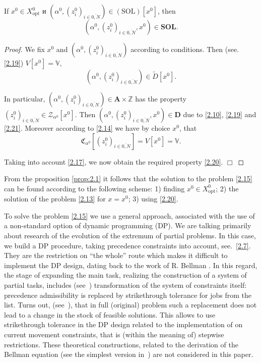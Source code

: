 \documentclass[10pt]{article}
\begin{document}
\begin{proposition}
\label{prop:2.1}
If
$x^0 \in X^0_{\mathrm{opt}}$ и $(\alpha^0,(z_i^0)_{i \in \overline{0,N}}) \in (\mathrm{SOL})[x^0]$,
then
\begin{equation}\label{2.20}
  (\alpha^0,(z_i^0)_{i \in \overline{0,N}},x^0) \in \mathbf{SOL}.
\end{equation}
\end{proposition}

\begin{proof}

We fix
$x^0$
and
$(\alpha^0,(z_i^0)_{i \in \overline{0,N}})$
according to conditions.
Then
(see. \eqref{2.19})
$V[x^0] = \mathbb{V},$
\begin{equation}\label{2.21}
 (\alpha^0,(z_i^0)_{i \in \overline{0,N}}) \in \tilde{D}[x^0].
\end{equation}

In particular,
$(\alpha^0,(z_i^0)_{i \in \overline{0,N}}) \in \mathbf{A} \times \mathbb{Z}$
has the property
$(z_i^0)_{i \in \overline{0,N}} \in \mathcal{Z}_{\alpha^0}[x^0]$.
Then
$(\alpha^0,(z_i^0)_{i \in \overline{0,N}},x^0) \in \mathbf{D}$
due to
\eqref{2.10}, \eqref{2.19} and \eqref{2.21}.
Moreover according to
\eqref{2.14}
we have by choice
$x^0$,
that
$$
  \mathfrak{C}_{\alpha^0}[(z_i^0)_{i \in \overline{0,N}}] = V[x^0] = \mathbb{V}.
$$

Taking into account
\eqref {2.17},
we now obtain the required property
\eqref {2.20}.
\hfill $\Box$
\end{proof}

From the proposition
\ref{prop:2.1}
it follows that
the solution to the problem
\eqref {2.15}
can be found according to the following scheme:
1) finding $ x ^ 0 \in X ^ 0 _ {\mathrm{opt}}$;
2) the solution of the problem \eqref{2.13} for $ x = x ^ 0$;
3) using \eqref{2.20}.

To solve the problem
\eqref{2.15}
we use a general approach,
associated with the use of a non-standard option of
dynamic programming
(DP).
We are talking primarily about research of
the evolution of the extremum of partial problems.
In this case, we build a DP procedure,
taking precedence constraints into account,
see.~\eqref{2.7}.
They are the restriction on
``the whole''
route
which makes it difficult to implement the DP design,
dating back to the work of R. Bellman
\cite{11}.
In this regard,
the stage of expanding the main task,
realizing the construction of a system of partial tasks,
includes
(see~\cite[part 2]{14})
transformation of the system
of constraints itself:
precedence admissibility
is replaced by strikethrough tolerance
for jobs from the list.
Turns out,
(see~\cite[Theorem 2.2.1]{14}),
that in full
(original)
problem
such a replacement does not lead to
a change in the stock of feasible solutions.
This allows to use
strikethrough tolerance
in the DP design
related to the implementation of on current movement constraints,
that is
(within the meaning of)
stepwise restrictions.
These theoretical constructions,
related to the derivation of the Bellman equation
(see the simplest version in~\cite[part 3]{14})
are not considered
in this paper.
\end{document}

